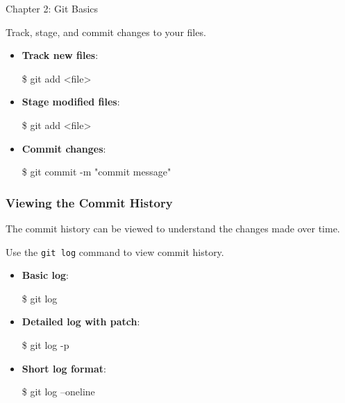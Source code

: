 \begin{notes}{Chapter 2: Git Basics}
    \begin{highlight}
    
        Track, stage, and commit changes to your files.
        
        \begin{itemize}
            \item \textbf{Track new files}:
    \begin{code}[Bash]
    \$ git add <file>
    \end{code}
            \item \textbf{Stage modified files}:
    \begin{code}[Bash]
    \$ git add <file>
    \end{code}
            \item \textbf{Commit changes}:
    \begin{code}[Bash]
    \$ git commit -m "commit message"
    \end{code}
        \end{itemize}
    
    \end{highlight}
    
    \subsubsection*{Viewing the Commit History}
    
    The commit history can be viewed to understand the changes made over time.
    
    \begin{highlight}
    
        Use the \texttt{git log} command to view commit history.
        
        \begin{itemize}
            \item \textbf{Basic log}:
    \begin{code}[Bash]
    \$ git log
    \end{code}
            \item \textbf{Detailed log with patch}:
    \begin{code}[Bash]
    \$ git log -p
    \end{code}
            \item \textbf{Short log format}:
    \begin{code}[Bash]
    \$ git log --oneline
    \end{code}
        \end{itemize}
    

\end{highlight}
\end{notes}
